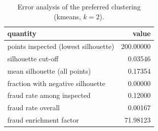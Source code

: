 \begin{table}[htbp]
\centering
\begin{tabular}{lr}
\toprule
quantity & value \\
\midrule
points inspected (lowest silhouette) & 200.00000 \\
silhouette cut-off & 0.03546 \\
mean silhouette (all points) & 0.17354 \\
fraction with negative silhouette & 0.00000 \\
fraud rate among inspected & 0.12000 \\
fraud rate overall & 0.00167 \\
fraud enrichment factor & 71.98123 \\
\bottomrule
\end{tabular}
\caption{Error analysis of the preferred clustering (kmeans, $k=2$).}
\label{tab:error-analysis}
\end{table}
